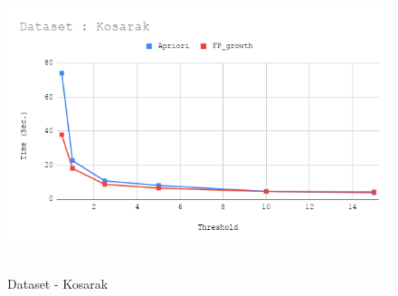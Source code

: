 \documentclass[12pt]{article}
\begin{document}
\begin{figure}[ht!]
	\centering
	\includegraphics[width = 0.95\columnwidth, height = 8.5cm]{Kosarak.png}
	\caption{Dataset - Kosarak}
	\label{fig:kosarak}
\end{figure}
\end{document}
